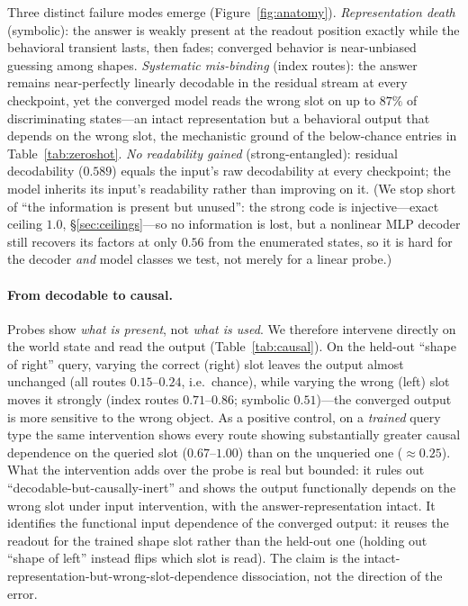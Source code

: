 \documentclass[10pt]{article} %
\begin{document}
Three distinct failure modes emerge (Figure~\ref{fig:anatomy}). \emph{Representation death}
(symbolic): the answer is weakly
present at the readout position exactly while the behavioral transient lasts, then fades;
converged behavior is near-unbiased guessing among shapes. \emph{Systematic mis-binding} (index
routes): the answer remains near-perfectly linearly decodable in the residual stream at every
checkpoint, yet the converged model reads the wrong slot on up to $87\%$ of discriminating states---an intact representation but a behavioral output that depends on the wrong slot, the mechanistic ground of the
below-chance entries in Table~\ref{tab:zeroshot}. \emph{No readability gained} (strong-entangled):
residual decodability ($0.589$) equals the input's raw decodability at every checkpoint; the model
inherits its input's readability rather than improving on it. (We stop short of ``the information
is present but unused'': the strong code is injective---exact ceiling $1.0$, \S\ref{sec:ceilings}---so
no information is lost, but a nonlinear MLP decoder still recovers its factors at only $0.56$ from
the enumerated states, so it is hard for the decoder \emph{and} model classes we test, not merely
for a linear probe.)

\paragraph{From decodable to causal.} Probes show \emph{what is present}, not \emph{what is used}.
We therefore intervene directly on the world state and read the output (Table~\ref{tab:causal}). On
the held-out ``shape of right'' query, varying the correct (right) slot leaves the output almost
unchanged (all routes $0.15$--$0.24$, i.e.\ chance), while varying the wrong (left) slot moves it
strongly (index routes $0.71$--$0.86$; symbolic $0.51$)---the converged output is more sensitive to
the wrong object. As a positive control, on a \emph{trained} query type the same intervention shows
every route showing substantially greater causal dependence on the queried slot ($0.67$--$1.00$)
than on the unqueried one ($\approx 0.25$). What the intervention adds over the probe is real but bounded: it rules out
``decodable-but-causally-inert'' and shows the output functionally depends on the wrong slot under
input intervention, with the answer-representation intact. It identifies the functional input dependence of the converged output: it
reuses the readout for the trained shape slot rather than the held-out one (holding out ``shape of
left'' instead flips which slot is read). The claim is the intact-representation-but-wrong-slot-dependence
dissociation, not the direction of the error.
\end{document}
